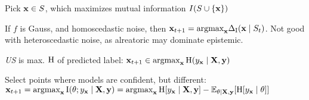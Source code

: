 \begin{definition}
    Pick \(\vb{x} \in S\), which maximizes mutual information \(I(S \cup \{\vb{x}\})\)
\end{definition}

\begin{definition}
    If \(f\) is Gauss, and homoscedastic noise, then \(\vb{x}_{t+1} = \text{argmax}_{\vb{x}}\Delta_{\operatorname{I}}(\vb{x} \mid S_t)\). Not good with heteroscedastic noise, as alreatoric may dominate epistemic.
\end{definition}

\begin{definition}[Classification]
    \textit{US} is max. \(\operatorname{H}\) of predicted label:
    \(\vb{x}_{t+1}\in\text{argmax}_{\vb{x}}\operatorname{H}(y_{\vb{x}} \mid \vb{X},\vb{y})\)
\end{definition}

\begin{definition}[BALD]
    Select points where models are confident, but different:
    \(\vb{x}_{t+1} = \text{argmax}_{\vb{x}} \operatorname{I}(\theta;y_{\vb{x}} \mid \vb{X}, \vb{y}) = \text{argmax}_{\vb{x}} \operatorname{H}[y_{\vb{x}} \mid \vb{X}, \vb{y}] - \mathbb{E}_{\theta \mid \vb{X}, \vb{y}}[\operatorname{H}[y_{\vb{x}} \mid \theta]]\)
\end{definition}